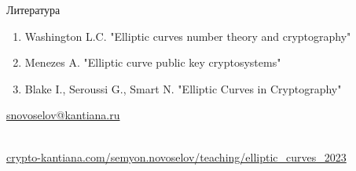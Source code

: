 \documentclass{beamer}
\begin{document}
	\begin{frame}{Литература}
		\nocite{Menezes1993}\nocite{Blake1999}\nocite{Washington2008}
		
		\begin{enumerate}
			\item[\structure{\faBook}] Washington L.C. "Elliptic curves number theory and cryptography"%
			\vspace{0.5em}
			
			\item[\structure{\faBook}] Menezes A. "Elliptic curve public key cryptosystems"
			\vspace{0.5em}
			
			\item[\structure{\faBook}] Blake I., Seroussi G., Smart N. "Elliptic Curves in Cryptography"
		\end{enumerate}
		
		\begin{center}
			\begin{tcolorbox}[enhanced,hbox,colback=block-green-color-bg,colframe=subsection-color!120,title=Контакты,center title]
				\begin{varwidth}{\textwidth}
					\begin{center}
						\href{mailto:snovoselov@kantiana.ru}{snovoselov@kantiana.ru}
					\end{center}
				\end{varwidth}
			\end{tcolorbox}	
		\end{center}
		
		\\
		{\footnotesize
			\href{https://crypto-kantiana.com/semyon.novoselov/teaching/elliptic_curves_2023}{crypto-kantiana.com/semyon.novoselov/teaching/elliptic\_curves\_2023}
		}
		
	\end{frame}
	
\end{document}
